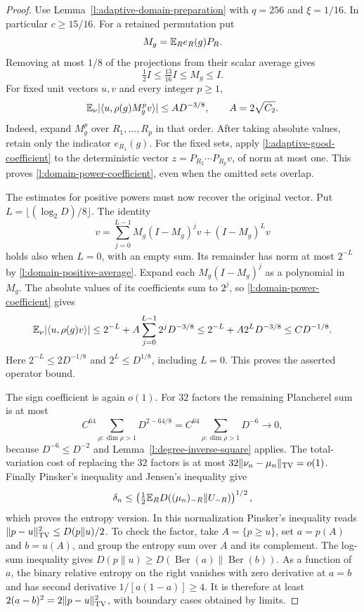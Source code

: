\begin{proof}
Use Lemma~\ref{l:adaptive-domain-preparation} with $q=256$ and
$\xi=1/16$. In particular $c\ge15/16$. For a retained permutation put
\[
 M_g=\mathbb E_R e_R(g)P_R.
\]
Removing at most $1/8$ of the projections from their scalar average
gives
\begin{equation}
 \tfrac12 I\le\tfrac{13}{16}I\le M_g\le I.
 \label{l:domain-positive-average}
\end{equation}
For fixed unit vectors $u,v$ and every integer $p\ge1$,
\begin{equation}
 \mathbb E_\nu|\langle u,\rho(g)M_g^p v\rangle|
 \le AD^{-3/8},\qquad A=2\sqrt{C_2}.
 \label{l:domain-power-coefficient}
\end{equation}
Indeed, expand $M_g^p$ over $R_1,\ldots,R_p$ in that order.
After taking absolute values, retain only the indicator $e_{R_1}(g)$.
For the fixed sets, apply \eqref{l:adaptive-good-coefficient} to the
deterministic vector $z=P_{R_2}\cdots P_{R_p}v$, of norm at most one.
This proves \eqref{l:domain-power-coefficient}, even when the omitted
sets overlap.

The estimates for positive powers must now recover the original vector.
Put $L=\lfloor(\log_2D)/8\rfloor$. The identity
\[
 v=\sum_{j=0}^{L-1}M_g(I-M_g)^jv+(I-M_g)^Lv
\]
holds also when $L=0$, with an empty sum. Its remainder has norm at
most $2^{-L}$ by \eqref{l:domain-positive-average}. Expand each
$M_g(I-M_g)^j$ as a polynomial in $M_g$. The absolute values of its
coefficients sum to $2^j$, so \eqref{l:domain-power-coefficient} gives
\[
 \mathbb E_\nu|\langle u,\rho(g)v\rangle|
 \le2^{-L}+A\sum_{j=0}^{L-1}2^jD^{-3/8}
 \le2^{-L}+A2^LD^{-3/8}
 \le CD^{-1/8}.
\]
Here $2^{-L}\le2D^{-1/8}$ and $2^L\le D^{1/8}$, including $L=0$.
This proves the asserted operator bound.

The sign coefficient is again $o(1)$. For $32$ factors the remaining
Plancherel sum is at most
\[
 C^{64}\sum_{\rho:\dim\rho>1}D^{2-64/8}
 =C^{64}\sum_{\rho:\dim\rho>1}D^{-6}\longrightarrow0,
\]
because $D^{-6}\le D^{-2}$ and Lemma~\ref{l:degree-inverse-square}
applies. The total-variation cost of replacing the $32$ factors is
at most $32\|\nu_n-\mu_n\|_{\mathrm{TV}}=o(1)$.
Finally Pinsker's inequality and Jensen's inequality give
\[
 \delta_n\le
 \left(\tfrac12\mathbb E_R D((\mu_n)_{-R}\|U_{-R})\right)^{1/2},
\]
which proves the entropy version. In this normalization Pinsker's
inequality reads $\|p-u\|_{\mathrm{TV}}^2\le D(p\|u)/2$. To check the
factor, take $A=\{p\ge u\}$, set $a=p(A)$ and $b=u(A)$, and group
the entropy sum over $A$ and its complement. The log-sum inequality
gives $D(p\|u)\ge D(\operatorname{Ber}(a)\|
\operatorname{Ber}(b))$. As a function of $a$, the binary relative
entropy on the right vanishes with zero derivative at $a=b$ and has second
derivative $1/[a(1-a)]\ge4$. It is therefore at least
$2(a-b)^2=2\|p-u\|_{\mathrm{TV}}^2$, with boundary cases obtained by limits.
\end{proof}
